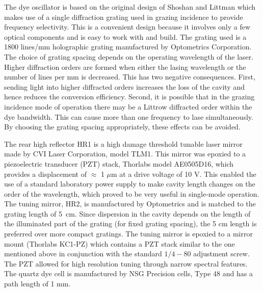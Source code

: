 The dye oscillator is based on the original design of Shoshan \cite{Shoshan:77}
and Littman 
\cite{Littman:78a,Littman:84} which makes use of a single diffraction 
grating used in grazing incidence to provide frequency selectivity.  
This is a convenient design because it involves only a few optical 
components and is easy to work with and build.  The grating used is a
1800 lines/mm holographic grating manufactured by Optometrics 
Corporation.  The choice of grating spacing depends on the operating wavelength 
of the laser.  Higher diffraction orders are formed when either the lasing
wavelength or the number of lines per mm is decreased.  This 
has two negative consequences.  First, sending light into higher diffracted
orders increases the loss of the cavity and hence reduces the 
conversion efficiency.  Second, it is possible that in the grazing 
incidence mode of operation there may be a Littrow diffracted order 
within the dye bandwidth.  This can cause more than one frequency to lase
simultaneously.  By choosing  the grating spacing appropriately, these effects
can be avoided.

The rear high reflector HR1 is a high damage threshold tunable laser mirror
made by CVI Laser Corporation, model TLM1.  This mirror was epoxied to a
piezoelectric transducer (PZT) stack, Thorlabs model AE0505D16, which provides
a displacement of $\approx$ 1 $\mu$m at a drive voltage of 10 V.  This
enabled the use of a standard laboratory power supply to make cavity length
changes on the order of the wavelength, which proved to be very useful in
single-mode operation.  The tuning mirror, HR2, is manufactured by Optometrics
and is matched to the grating length of 5~cm.  Since dispersion in the
cavity depends on the length of the illuminated part of the grating (for fixed
grating spacing), the 5 cm length is preferred over more compact
gratings.  The tuning mirror is epoxied to a mirror mount (Thorlabs KC1-PZ)
which contains a PZT stack similar to the one mentioned above in conjunction
with the standard $ 1/4-80 $ adjustment screw.  The PZT allowed for high
resolution tuning through narrow spectral features.  The quartz  dye cell is
manufactured by NSG Precision cells, Type 48 and has a path length of 1 mm.


